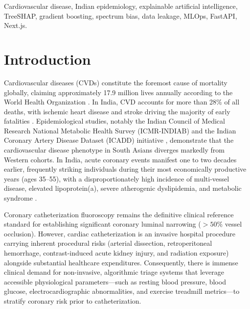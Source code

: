 \documentclass[conference]{IEEEtran}
\begin{document}
\begin{IEEEkeywords}
Cardiovascular disease, Indian epidemiology, explainable artificial intelligence, TreeSHAP, gradient boosting, spectrum bias, data leakage, MLOps, FastAPI, Next.js.
\end{IEEEkeywords}

\section{Introduction}
Cardiovascular diseases (CVDs) constitute the foremost cause of mortality globally, claiming approximately 17.9 million lives annually according to the World Health Organization \cite{who2024}. In India, CVD accounts for more than 28\% of all deaths, with ischemic heart disease and stroke driving the majority of early fatalities \cite{indiab}. Epidemiological studies, notably the Indian Council of Medical Research National Metabolic Health Survey (ICMR-INDIAB) \cite{indiab} and the Indian Coronary Artery Disease Dataset (ICADD) initiative \cite{icadd}, demonstrate that the cardiovascular disease phenotype in South Asians diverges markedly from Western cohorts. In India, acute coronary events manifest one to two decades earlier, frequently striking individuals during their most economically productive years (ages 35--55), with a disproportionately high incidence of multi-vessel disease, elevated lipoprotein(a), severe atherogenic dyslipidemia, and metabolic syndrome \cite{prabhakaran2016}.

Coronary catheterization fluoroscopy remains the definitive clinical reference standard for establishing significant coronary luminal narrowing ($>50\%$ vessel occlusion). However, cardiac catheterization is an invasive hospital procedure carrying inherent procedural risks (arterial dissection, retroperitoneal hemorrhage, contrast-induced acute kidney injury, and radiation exposure) alongside substantial healthcare expenditures. Consequently, there is immense clinical demand for non-invasive, algorithmic triage systems that leverage accessible physiological parameters—such as resting blood pressure, blood glucose, electrocardiographic abnormalities, and exercise treadmill metrics—to stratify coronary risk prior to catheterization.
\end{document}
